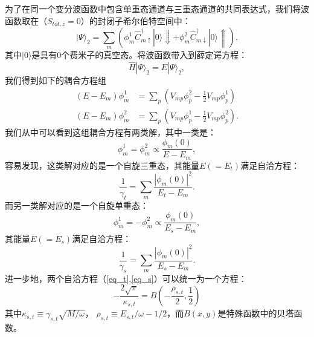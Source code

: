 为了在同一个变分波函数中包含单重态通道与三重态通道的共同表达式，我们将波函数取在（$S_{tot,z}=0$）的封闭子希尔伯特空间中：
\begin{equation}
	|\Psi\rangle_2=\sum_m \left( \phi_m^1 \hat{C}_{m\uparrow}^\dagger|0\rangle \Downarrow+ \phi_m^2 \hat{C}_{m\downarrow}^\dagger|0\rangle \Uparrow \right).
\end{equation}
其中$|0\rangle$是具有0个费米子的真空态。将波函数带入到薛定谔方程：
\begin{equation}
	\hat{H} |\Psi \rangle_2 = E |\Psi\rangle_2,
\end{equation}
我们得到如下的耦合方程组
\begin{equation}
    \begin{split}
      (E-E_m) \phi^1_m &= \sum_p (V_{mp}\phi^2_p-\frac{1}{2}V_{mp}\phi^1_p )\\
      (E-E_m) \phi^2_m &= \sum_p (V_{mp}\phi_p^1 -\frac{1}{2}V_{mp}\phi^2_p).
    \end{split}
\end{equation}
我们从中可以看到这组耦合方程有两类解，其中一类是：
\begin{equation}
    \phi^1_m=\phi^2_m \propto \frac{\phi_m(0)}{E-E_m},
\end{equation}
容易发现，这类解对应的是一个自旋三重态，其能量$E(=E_t)$满足自洽方程：
\begin{equation}
      \frac{1}{\gamma_t} =  \sum_m \frac{|\phi_m(0)|^2}{E_t-E_m}. \label{eq_t}
\end{equation}
而另一类解对应的是一个自旋单重态：
    \begin{equation}
      \phi^1_m = -\phi^2_m\propto \frac{\phi_m(0)}{E_s-E_m},
    \end{equation}
其能量$E(=E_s)$满足自洽方程：
	\begin{equation}
      \frac{1}{\gamma_s} =  \sum_m \frac{|\phi_m(0)|^2}{E_s-E_m}. \label{eq_s}
    \end{equation}
进一步地，两个自洽方程（\ref{eq_t},\ref{eq_s}）可以统一为一个方程：
    \begin{equation}
        -\frac{2\sqrt{\pi}}{\kappa_{s,t}} = B(-\frac{\rho_{s,t}}{2},\frac{1}{2}) 
    \end{equation}
其中$\kappa_{s,t} \equiv \gamma_{s,t}\sqrt{M/\omega}$， $\rho_{s,t} \equiv E_{s,t}/\omega-1/2$，而$B(x,y)$是特殊函数中的贝塔函数。

